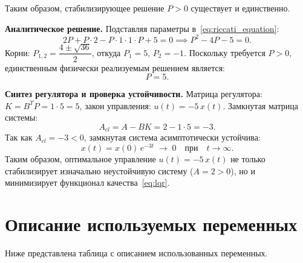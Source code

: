 \documentclass[12pt, a4paper, oneside]{extarticle}
\begin{document}
Таким образом, стабилизирующее решение $P > 0$ существует и единственно.

\textbf{Аналитическое решение.} Подставляя параметры
в~\eqref{eq:riccati_equation}:
\begin{equation*}
    2P + P \cdot 2 - P \cdot 1 \cdot 1 \cdot P + 5 = 0
    \implies P^2 - 4P - 5 = 0.
\end{equation*}
Корни: $P_{1,2} = \dfrac{4 \pm \sqrt{36}}{2}$, откуда $P_1 = 5$, $P_2 = -1$.
Поскольку требуется $P > 0$, единственным физически реализуемым решением
является:
\begin{equation*}
    P = 5.
\end{equation*}

\textbf{Синтез регулятора и проверка устойчивости.} Матрица регулятора:
$K = B^T P = 1 \cdot 5 = 5$, закон управления: $u(t) = -5\,x(t)$. Замкнутая
матрица системы:
\begin{equation*}
    A_{cl} = A - BK = 2 - 1 \cdot 5 = -3.
\end{equation*}
Так как $A_{cl} = -3 < 0$, замкнутая система асимптотически устойчива:
\begin{equation*}
    x(t) = x(0)\,e^{-3t} \;\to\; 0 \quad\text{при}\quad t \to \infty.
\end{equation*}
Таким образом, оптимальное управление $u(t) = -5\,x(t)$ не только стабилизирует
изначально неустойчивую систему ($A = 2 > 0$), но и минимизирует функционал
качества~\eqref{eq:lqr}.








\clearpage
\section{Описание используемых переменных}

Ниже представлена таблица с описанием использованных переменных.
\end{document}
